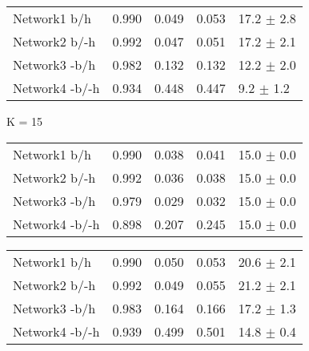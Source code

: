 \begin{table*}[h]
\begin{minipage}[h]{0.45\linewidth}
\begin{tabular}{lllll}
\hline
\end{tabular}
\end{minipage}
\hspace{0.8cm}
\begin{minipage}[h]{0.45\linewidth}
\begin{tabular}{lllll}
 Network1 b/h       &    0.990 &       0.049 &    0.053 & 17.2 $\pm$ 2.8 \\
 Network2 b/-h     &    0.992 &       0.047 &    0.051 & 17.2 $\pm$ 2.1 \\
 Network3 -b/h     &    0.982 &       0.132 &    0.132 & 12.2 $\pm$ 2.0 \\
 Network4 -b/-h     &    0.934 &       0.448 &    0.447 & 9.2 $\pm$ 1.2 \\

\hline
\end{tabular}
\end{minipage}


	\begin{minipage}[h]{0.45\linewidth} 
K = 15
\begin{tabular}{lrrrr}
 Network1 b/h         &    0.990 &       0.038 &    0.041 & 15.0 $\pm$ 0.0 \\
 Network2 b/-h       &    0.992 &       0.036 &    0.038 & 15.0 $\pm$ 0.0 \\
 Network3 -b/h       &    0.979 &       0.029 &    0.032 & 15.0 $\pm$ 0.0 \\
 Network4 -b/-h       &    0.898 &       0.207 &    0.245 & 15.0 $\pm$ 0.0 \\

\hline
\end{tabular}
\end{minipage}
\hspace{0.8cm}
\begin{minipage}[h]{0.45\linewidth}
\begin{tabular}{lrrrr}
 Network1 b/h       &    0.990 &       0.050 &    0.053 & 20.6 $\pm$ 2.1 \\
 Network2 b/-h     &    0.992 &       0.049 &    0.055 & 21.2 $\pm$ 2.1 \\
 Network3 -b/h     &    0.983 &       0.164 &    0.166 & 17.2 $\pm$ 1.3 \\
 Network4 -b/-h     &    0.939 &       0.499 &    0.501 & 14.8 $\pm$ 0.4    \\

\hline
\end{tabular}
\end{minipage}


\end{table*}
